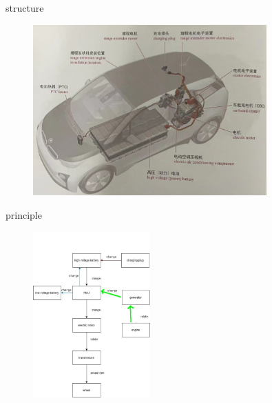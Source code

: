 \begin{frame}
	\begin{block}{}
		\begin{compactitem}
			\item structure
				\begin{figure}[htbp]
					\centering
					\includegraphics[width=0.8\textwidth]{1-19}
				\end{figure}
		\end{compactitem}
	\end{block}
\end{frame}
\begin{frame}
	\begin{block}{}
		\begin{compactitem}
			\item principle
				\begin{figure}[htbp]
					\centering
					\includegraphics[width=0.4\textwidth]{1-20}
				\end{figure}
		\end{compactitem}
	\end{block}
\end{frame}
